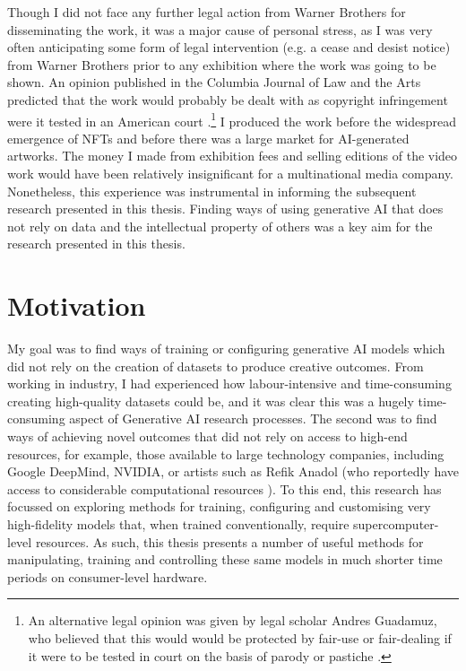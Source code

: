 Though I did not face any further legal action from Warner Brothers for  disseminating the work, it was a major cause of personal stress, as I was very often anticipating some form of legal intervention (e.g. a cease and desist notice) from Warner Brothers prior to any exhibition where the work was going to be shown.
An opinion published in the Columbia Journal of Law and the Arts predicted that the work would probably be dealt with as copyright infringement were it tested in an American court \citep{sobel2017artificial}.\footnote{An alternative legal opinion was given by legal scholar Andres Guadamuz, who believed that this would would be protected by fair-use or fair-dealing if it were to be tested in court on the basis of parody or pastiche \citep{guadamuz2024personal}.} 
I produced the work before the widespread emergence of NFTs and before there was a large market for AI-generated artworks. 
The money I made from exhibition fees and selling editions of the video work would have been relatively insignificant for a multinational media company. 
Nonetheless, this experience was instrumental in informing the subsequent research presented in this thesis. 
Finding ways of using generative AI that does not rely on data and the intellectual property of others was a key aim for the research presented in this thesis.

\section{Motivation}

My goal was to find ways of training or configuring generative AI models which did not rely on the creation of datasets to produce creative outcomes. 
From working in industry, I had experienced how labour-intensive and time-consuming creating high-quality datasets could be, and it was clear this was a hugely time-consuming aspect of Generative AI research processes.
The second was to find ways of achieving novel outcomes that did not rely on access to high-end resources, for example, those available to large technology companies, including Google DeepMind, NVIDIA, or artists such as Refik Anadol (who reportedly have access to considerable computational resources  \citep{caulfield2022refik}). 
To this end, this research has focussed on exploring methods for training, configuring and customising very high-fidelity models that, when trained conventionally, require supercomputer-level resources. 
As such, this thesis presents a number of useful methods for manipulating, training and controlling these same models in much shorter time periods on consumer-level hardware.


